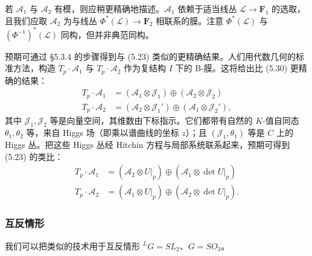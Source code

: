 若 $\mathcal{A}_1$ 与 $\mathcal{A}_2$ 有模，则应稍更精确地描述。$\mathcal{A}_1$ 依赖于适当线丛 $\mathcal{L}\to\boldsymbol{F}_1$ 的选取，且我们应取 $\mathcal{A}_2$ 为与线丛 $\Phi^*(\mathcal{L})\to\boldsymbol{F}_2$ 相联系的膜。注意 $\Phi^*(\mathcal{L})$ 与 $(\Phi^{-1})^*(\mathcal{L})$ 同构，但并非典范同构。

预期可通过 §5.3.4 的步骤得到与 (5.23) 类似的更精确结果。人们用代数几何的标准方法，构造 $T_p\cdot\mathcal{A}_1$ 与 $T_p\cdot\mathcal{A}_2$ 作为复结构 $I$ 下的 B-膜。这将给出比
(5.30) 更精确的结果：
\begin{equation}\tag{5.31}
\begin{aligned}
T_p\cdot\mathcal{A}_1 &= (\mathcal{A}_1\otimes\mathcal{J}_1)\oplus(\mathcal{A}_2\otimes\mathcal{J}_2)\\
T_p\cdot\mathcal{A}_2 &= (\mathcal{A}_2\otimes\mathcal{J}_1')\oplus(\mathcal{A}_1\otimes\mathcal{J}_2'),
\end{aligned}
\end{equation}
其中 $\mathcal{J}_1,\mathcal{J}_2$ 等是向量空间，其维数由下标指示。它们都带有自然的 $K$-值自同态 $\theta_1,\theta_2$ 等，来自 Higgs 场（即乘以谱曲线的坐标 $z$）；且 $(\mathcal{J}_1,\theta_1)$ 等是 $C$ 上的 Higgs 丛。把这些 Higgs 丛经 Hitchin 方程与局部系统联系起来，预期可得到 (5.23) 的类比：
\begin{equation}\tag{5.32}
\begin{aligned}
T_p\cdot\mathcal{A}_1 &= (\mathcal{A}_2\otimes U|_p)\oplus(\mathcal{A}_1\otimes\det U|_p)\\
T_p\cdot\mathcal{A}_2 &= (\mathcal{A}_1\otimes U|_p)\oplus(\mathcal{A}_2\otimes\det U|_p).
\end{aligned}
\end{equation}


\subsubsection{互反情形}

我们可以把类似的技术用于互反情形 ${}^{L}G=SL_2$、$G=SO_3$。

